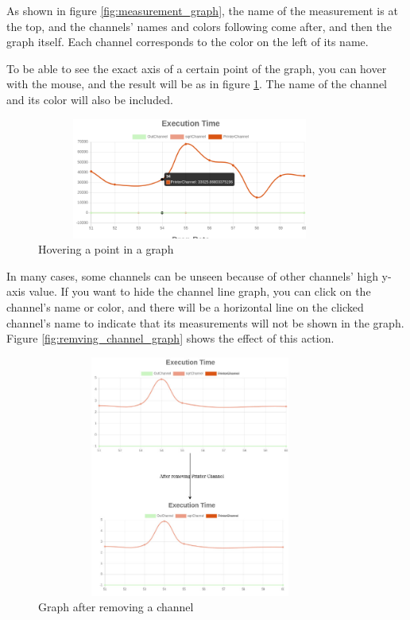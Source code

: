 As shown in figure \ref{fig:measurement_graph}, the name of the measurement is at the top, and the channels'
names and colors following come after, and then the graph itself. Each channel corresponds to the color
on the left of its name.

To be able to see the exact axis of a certain point of the graph, you can hover with the mouse, 
and the result will be as in figure \ref{fig:hover_graph}. The name of the channel and its color
will also be included. 
\newline
\begin{figure}[H]
	\centering
	\includegraphics[width=0.9\textwidth,height=150px]{images/hover_graph.png}
	\caption{Hovering a point in a graph}
	\label{fig:hover_graph}
\end{figure}

In many cases, some channels can be unseen because of other channels' high y-axis value. If you want
to hide the channel line graph, you can click on the channel's name or color, and there will be 
a horizontal line on the clicked channel's name to indicate that its measurements will not be shown
in the graph. Figure 
\ref{fig:remving_channel_graph} shows the effect of this action.
\newline
\begin{figure}[H]
	\centering
	\includegraphics[width=0.9\textwidth,height=300px]{images/removnig_channel_graph.jpg}
	\caption{Graph after removing a channel}
	\label{fig:removing_channel_graph}
\end{figure}

